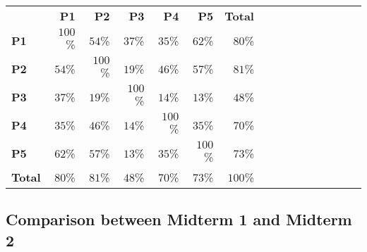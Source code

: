\documentclass[11pt]{handout}
\begin{document}
\begin{center}
\begin{tabular}{lrrrrrrrrrrrrrrr}
& \textbf{P1}
& \textbf{P2}
& \textbf{P3}
& \textbf{P4}
& \textbf{P5}
 & \textbf{Total} \\
  \textbf{P1}
    & \color{blue!100!green!90!black} $100$\%
    & \color{blue!54!green!90!black} $54$\%
    & \color{blue!37!green!90!black} $37$\%
    & \color{blue!35!green!90!black} $35$\%
    & \color{blue!61!green!90!black} $62$\%
    & \color{blue!79!green!90!black} $80$\%
 \\
  \textbf{P2}
    & \color{blue!54!green!90!black} $54$\%
    & \color{blue!99!green!90!black} $100$\%
    & \color{blue!18!green!90!black} $19$\%
    & \color{blue!45!green!90!black} $46$\%
    & \color{blue!57!green!90!black} $57$\%
    & \color{blue!80!green!90!black} $81$\%
 \\
  \textbf{P3}
    & \color{blue!37!green!90!black} $37$\%
    & \color{blue!18!green!90!black} $19$\%
    & \color{blue!100!green!90!black} $100$\%
    & \color{blue!13!green!90!black} $14$\%
    & \color{blue!12!green!90!black} $13$\%
    & \color{blue!47!green!90!black} $48$\%
 \\
  \textbf{P4}
    & \color{blue!35!green!90!black} $35$\%
    & \color{blue!45!green!90!black} $46$\%
    & \color{blue!13!green!90!black} $14$\%
    & \color{blue!99!green!90!black} $100$\%
    & \color{blue!34!green!90!black} $35$\%
    & \color{blue!69!green!90!black} $70$\%
 \\
  \textbf{P5}
    & \color{blue!61!green!90!black} $62$\%
    & \color{blue!57!green!90!black} $57$\%
    & \color{blue!12!green!90!black} $13$\%
    & \color{blue!34!green!90!black} $35$\%
    & \color{blue!99!green!90!black} $100$\%
    & \color{blue!72!green!90!black} $73$\%
 \\
  \textbf{Total}
    & \color{blue!79!green!90!black} $80$\%
    & \color{blue!80!green!90!black} $81$\%
    & \color{blue!47!green!90!black} $48$\%
    & \color{blue!69!green!90!black} $70$\%
    & \color{blue!72!green!90!black} $73$\%
    & \color{blue!99!green!90!black} $100$\%
 \\
\end{tabular}
\end{center}


\pagebreak

\subsection*{Comparison between Midterm 1 and Midterm 2}
\end{document}
